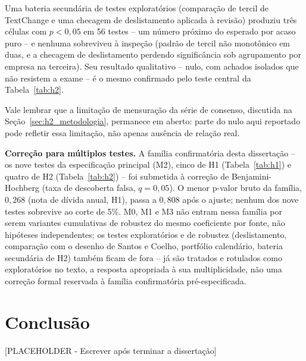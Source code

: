 \documentclass[a4paper,12pt]{report}
\begin{document}
Uma bateria secundária de testes exploratórios (comparação de tercil de TextChange e uma checagem de deslistamento aplicada à revisão) produziu três células com $p<0{,}05$ em 56 testes -- um número próximo do esperado por acaso puro -- e nenhuma sobreviveu à inspeção (padrão de tercil não monotônico em duas, e a checagem de deslistamento perdendo significância sob agrupamento por empresa na terceira). Seu resultado qualitativo -- nulo, com achados isolados que não resistem a exame -- é o mesmo confirmado pelo teste central da Tabela~\ref{tab:h2}.

Vale lembrar que a limitação de mensuração da série de consenso, discutida na Seção~\ref{sec:h2_metodologia}, permanece em aberto: parte do nulo aqui reportado pode refletir essa limitação, não apenas ausência de relação real.

\textbf{Correção para múltiplos testes.} A família confirmatória desta dissertação -- os nove testes da especificação principal (M2), cinco de H1 (Tabela~\ref{tab:h1}) e quatro de H2 (Tabela~\ref{tab:h2}) -- foi submetida à correção de Benjamini-Hochberg \cite{benjaminihochberg1995} (taxa de descoberta falsa, $q=0{,}05$). O menor p-valor bruto da família, $0{,}268$ (nota de dívida anual, H1), passa a $0{,}808$ após o ajuste; nenhum dos nove testes sobrevive ao corte de 5\%. M0, M1 e M3 não entram nessa família por serem variantes cumulativas de robustez do mesmo coeficiente por fonte, não hipóteses independentes; os testes exploratórios e de robustez (deslistamento, comparação com o desenho de Santos e Coelho, portfólio calendário, bateria secundária de H2) também ficam de fora -- já são tratados e rotulados como exploratórios no texto, a resposta apropriada à sua multiplicidade, não uma correção formal reservada à família confirmatória pré-especificada.

\chapter{Conclusão}
\label{ch:conclusao}

[PLACEHOLDER - Escrever após terminar a dissertação]



\end{document}
